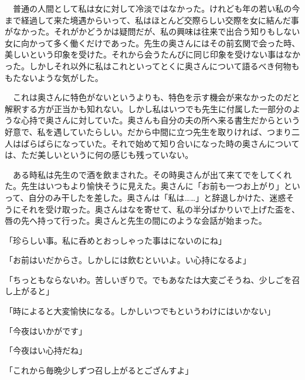 \documentclass[a4j,onecolumn]{tarticle}
\begin{document}
　普通の人間として私は女に対して冷淡ではなかった。\hbox{}けれども年の若い私の今まで経過して来た境遇からいって、\hbox{}私はほとんど交際らしい交際を女に結んだ事がなかった。\hbox{}それがかどうかは疑問だが、\hbox{}私の興味は往来で出合う知りもしない女に向かって多く働くだけであった。\hbox{}先生の奥さんにはその前玄関で会った時、\hbox{}美しいという印象を受けた。\hbox{}それから会うたんびに同じ印象を受けない事はなかった。\hbox{}しかしそれ以外に私はこれといってとくに奥さんについて語るべき何物ももたないような気がした。\hbox{}\par{}
　これは奥さんに特色がないというよりも、\hbox{}特色を示す機会が来なかったのだと解釈する方が正当かも知れない。\hbox{}しかし私はいつでも先生に付属した一部分のような心持で奥さんに対していた。\hbox{}奥さんも自分の夫の所へ来る書生だからという好意で、\hbox{}私を遇していたらしい。\hbox{}だから中間に立つ先生を取りければ、\hbox{}つまり二人はばらばらになっていた。\hbox{}それで始めて知り合いになった時の奥さんについては、\hbox{}ただ美しいというに何の感じも残っていない。\hbox{}\par{}
　ある時私は先生ので酒を飲まされた。\hbox{}その時奥さんが出て来てでをしてくれた。\hbox{}先生はいつもより愉快そうに見えた。\hbox{}奥さんに「お前も一つお上がり」といって、\hbox{}自分のみ干したを差した。\hbox{}奥さんは「私は……」と辞退しかけた、\hbox{}迷惑そうにそれを受け取った。\hbox{}奥さんはなを寄せて、\hbox{}私の半分ばかりいで上げた盃を、\hbox{}唇の先へ持って行った。\hbox{}奥さんと先生の間にのような会話が始まった。\hbox{}\par{}
「珍らしい事。\hbox{}私に呑めとおっしゃった事はにないのにね」\par{}
「お前はいだからさ。\hbox{}しかしには飲むといいよ。\hbox{}い心持になるよ」\par{}
「ちっともならないわ。\hbox{}苦しいぎりで。\hbox{}でもあなたは大変ごそうね、\hbox{}少しごを召し上がると」\par{}
「時によると大変愉快になる。\hbox{}しかしいつでもというわけにはいかない」\par{}
「今夜はいかがです」\par{}
「今夜はい心持だね」\par{}
「これから毎晩少しずつ召し上がるとござんすよ」\par{}
\end{document}
